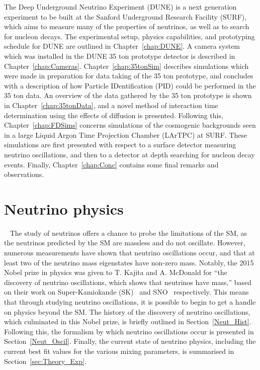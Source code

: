 The Deep Underground Neutrino Experiment (DUNE) is a next generation experiment to be built at the Sanford Underground Research Facility (SURF), which aims to measure many of the properties of neutrinos, as well as to search for nucleon decays. The experimental setup, physics capabilities, and prototyping schedule for DUNE are outlined in Chapter~\ref{chap:DUNE}. A camera system which was installed in the DUNE 35 ton prototype detector is described in Chapter~\ref{chap:Cameras}. Chapter~\ref{chap:35tonSim} describes simulations which were made in preparation for data taking of the 35 ton prototype, and concludes with a description of how Particle IDentification (PID) could be performed in the 35 ton data. An overview of the data gathered by the 35 ton prototype is shown in Chapter~\ref{chap:35tonData}, and a novel method of interaction time determination using the effects of diffusion is presented. Following this, Chapter~\ref{chap:FDSims} concerns simulations of the cosmogenic backgrounds seen in a large Liquid Argon Time Projection Chamber (LArTPC) at SURF. These simulations are first presented with respect to a surface detector measuring neutrino oscillations, and then to a detector at depth searching for nucleon decay events. Finally, Chapter~\ref{chap:Conc} contains some final remarks and observations. \\

\section{Neutrino physics} ~\label{sec:NeutPhys}  %
The study of neutrinos offers a chance to probe the limitations of the SM, as the neutrinos predicted by the SM are massless and do not oscillate. However, numerous measurements have shown that neutrino oscillations occur, and that at least two of the neutrino mass eigenstates have non-zero mass. Notably, the 2015 Nobel prize in physics was given to T. Kajita and A. McDonald for ``the discovery of neutrino oscillations, which shows that neutrinos have mass,'' based on their work on Super-Kamiokande (SK)~\citep{PhysRevLett.81.1562} and SNO~\citep{PhysRevLett.89.011301} respectively. This means that through studying neutrino oscillations, it is possible to begin to get a handle on physics beyond the SM. The history of the discovery of neutrino oscillations, which culminated in this Nobel prize, is briefly outlined in Section~\ref{Neut_Hist}. Following this, the formalism by which neutrino oscillations occur is presented in Section~\ref{Neut_Oscil}. Finally, the current state of neutrino physics, including the current best fit values for the various mixing parameters, is summarised in Section~\ref{sec:Theory_Exp}. \\

